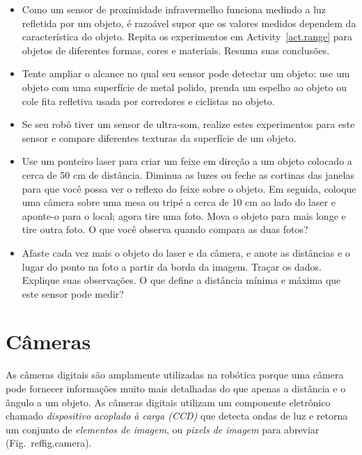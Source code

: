 \begin{framed}

\begin{itemize}
\item Como um sensor de proximidade infravermelho funciona medindo a luz refletida por um objeto, é razoável supor que os valores medidos dependem da característica do objeto. Repita os experimentos em Activity~\ref{act.range} para objetos de diferentes formas, cores e materiais. Resuma suas conclusões.
\item Tente ampliar o alcance no qual seu sensor pode detectar um objeto: use um objeto com uma superfície de metal polido, prenda um espelho ao objeto ou cole fita refletiva usada por corredores e ciclistas no objeto.
\item Se seu robô tiver um sensor de ultra-som, realize estes experimentos para este sensor e compare diferentes texturas da superfície de um objeto.
\end{itemize}
\end{framed}

\begin{framed}

\begin{itemize}
\item Use um ponteiro laser para criar um feixe em direção a um objeto colocado a cerca de 50 cm de distância. Diminua as luzes ou feche as cortinas das janelas para que você possa ver o reflexo do feixe sobre o objeto. Em seguida, coloque uma câmera sobre uma mesa ou tripé a cerca de 10 cm ao lado do laser e aponte-o para o local; agora tire uma foto. Mova o objeto para mais longe e tire outra foto. O que você observa quando compara as duas fotos?
\item Afaste cada vez mais o objeto do laser e da câmera, e anote as distâncias e o lugar do ponto na foto a partir da borda da imagem. Traçar os dados. Explique suas observações. O que define a distância mínima e máxima que este sensor pode medir?
\end{itemize}
\end{framed}

\section{Câmeras}\label{s.cameras}

As câmeras digitais são amplamente utilizadas na robótica porque uma câmera pode fornecer informações muito mais detalhadas do que apenas a distância e o ângulo a um objeto. As câmeras digitais utilizam um componente eletrônico chamado \emph{dispositivo acoplado à carga (CCD)} que detecta ondas de luz e retorna um conjunto de \emph{elementos de imagem}, ou \emph{pixels de imagem} para abreviar (Fig.~ref{fig.camera}).

